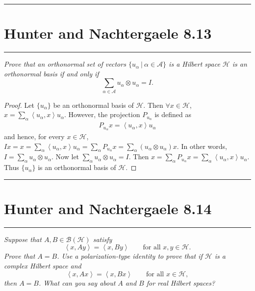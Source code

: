\documentclass{article} %
\theoremstyle{plain}
\newcommand{\VEC}[2]{\left\langle #1, #2 \right\rangle}
\newcommand{\Hilb}{\mathcal{H}}
\newcommand{\problem}[1]{
\vspace{.375cm}
\begin{minipage}{\textwidth}
    \begin{center}
        \noindent\rule{5cm}{1pt}
    \end{center}
    \section{\bf #1}
    \begin{center}
        \noindent\rule{5cm}{1pt}
    \end{center}
    \vspace{0.25cm}
\end{minipage}
}
\numberwithin{equation}{section} %
\numberwithin{figure}{section} %
\numberwithin{table}{section} %
\begin{document}
\problem{Hunter and Nachtergaele 8.13}
\emph{Prove that an orthonormal set of vectors $\{u_\alpha\ |\ \alpha \in \mathcal{A}\}$ is a Hilbert space $\Hilb$ is an orthonormal basis if and only if $$\sum_{\alpha \in \mathcal{A}} u_\alpha \otimes u_\alpha = I.$$}

\begin{proof}
    Let $\{u_\alpha\}$ be an orthonormal basis of $\Hilb$.  Then $\forall x \in \Hilb$, $x = \sum_\alpha \VEC{u_\alpha}{x}u_\alpha$.  However, the projection $P_{u_\alpha}$ is defined as
    \begin{align*}
        P_{u_\alpha}x = \VEC{u_\alpha}{x}u_\alpha
    \end{align*}
    and hence, for every $x \in \Hilb$, $I x = x = \sum_\alpha \VEC{u_\alpha}{x}u_\alpha = \sum_\alpha P_{u_\alpha}x = \sum_\alpha (u_\alpha \otimes u_\alpha) x$.  In other words, $I = \sum_\alpha u_\alpha \otimes u_\alpha$.  Now let $\sum_\alpha u_\alpha \otimes u_\alpha = I$.  Then $x = \sum_\alpha P_{u_\alpha}x = \sum_\alpha \VEC{u_\alpha}{x}u_\alpha$.  Thus $\{u_\alpha\}$ is an orthonormal basis of $\Hilb$.
\end{proof}







\problem{Hunter and Nachtergaele 8.14}
\emph{Suppose that $A, B \in \mathcal{B}(\Hilb)$ satisfy $$\VEC{x}{Ay} = \VEC{x}{By} \qquad \text{for all } x, y \in \Hilb.$$  Prove that $A = B$.  Use a polarization-type identity to prove that if $\Hilb$ is a complex Hilbert space and $$\VEC{x}{Ax} = \VEC{x}{Bx} \qquad \text{for all } x \in \Hilb,$$ then $A = B$.  What can you say about $A$ and $B$ for real Hilbert spaces?}
\end{document}
